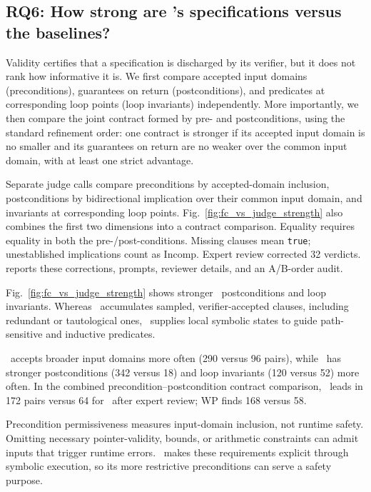 \subsection{RQ6: How strong are \toolname's specifications versus the baselines?}
\label{subsec:rq6-strength}

{Validity certifies that a specification is discharged by its verifier, but it does not rank how informative it is. We first compare accepted input domains (preconditions), guarantees on return (postconditions), and predicates at corresponding loop points (loop invariants) independently. More importantly, we then compare the joint contract formed by pre- and postconditions, using the standard refinement order: one contract is stronger if its accepted input domain is no smaller and its guarantees on return are no weaker over the common input domain, with at least one strict advantage.}

\smallskip
{}
{Separate judge calls compare preconditions by accepted-domain inclusion, postconditions by bidirectional implication over their common input domain, and invariants at corresponding loop points. Fig.~\ref{fig:fc_vs_judge_strength} also combines the first two dimensions into a contract comparison. Equality requires equality in both the pre-/post-conditions. Missing clauses mean \texttt{true}; unestablished implications count as Incomp. Expert review corrected 32 verdicts.  reports these corrections, prompts, reviewer details, and an A/B-order audit.}

{Fig.~\ref{fig:fc_vs_judge_strength} shows stronger \toolname\ postconditions and loop invariants. Whereas \autospec\ accumulates sampled, verifier-accepted clauses, including redundant or tautological ones, \toolname\ supplies local symbolic states to guide path-sensitive and inductive predicates.}

{\autospec\ accepts broader input domains more often (290 versus 96 pairs), while \toolname\ has stronger postconditions (342 versus 18) and loop invariants (120 versus 52) more often. In the combined precondition--postcondition contract comparison, \toolname\ leads in 172 pairs versus 64 for \autospec\ after expert review; WP finds 168 versus 58.}

{Precondition permissiveness measures input-domain inclusion, not runtime safety. Omitting necessary pointer-validity, bounds, or arithmetic constraints can admit inputs that trigger runtime errors. \toolname\ makes these requirements explicit through symbolic execution, so its more restrictive preconditions can serve a safety purpose.}

